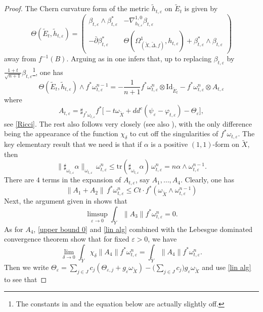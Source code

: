 \documentclass[12pt]{amsart}
\theoremstyle{definition}
\newcommand{\tX}{\widetilde{X}}
\newcommand{\tY}{\widetilde{Y}}
\newcommand{\tE}{\widetilde{E}}
\numberwithin{equation}{section}
\newcommand{\tDe}{\widetilde \Delta}
\newcommand{\ep}{\varepsilon}
\begin{document}
\begin{proof}
The Chern curvature form of the metric $\tilde h_{t,\ep}$ on $\tE_t$ is given by
 \[\Theta(\tE_t,\tilde h_{t,\ep})=
 \begin{pmatrix}
  \beta_{t,\ep}\wedge \beta_{t,\ep}^* & -\nabla^{1,0}_{h_{t,\ep}}\beta_{t,\ep}\\
 -\bar \partial  \beta_{t,\ep}^* & \Theta(\Omega_{(\tX, \tDe, f)}^1, h_{t,\ep}) +\beta_{t,\ep}^*\wedge \beta_{t,\ep}
 \end{pmatrix}
 \]
 away from $f^{-1}(B)$. Arguing as in \cite[p. 105]{DGP-Q-Fano-decomp} one infers that, up to replacing $\beta_{t,\ep}$ by $\frac{1+t}{\sqrt{n+1}}\beta_{t,\ep}$\footnote{The constants in \cite[(32)-(33)]{DGP-Q-Fano-decomp} and the equation below are actually slightly off.}, one has 
 \begin{equation}
 \label{curv}
 \Theta(\tE_t,\tilde h_{t,\ep})\wedge f^*\omega_{t,\ep}^{n-1}=-\frac 1{n+1} f^*\omega_{t,\ep}^{n} \otimes \mathrm{Id}_{\tE_t}-f^*\omega_{t,\ep}^{n} \otimes A_{t,\ep}
 \end{equation}
 where \[A_{t,\ep}=\sharp_{f^*\omega_{t,\ep}}f^*\big[-t \omega_{\tX}+dd^c(\psi_\ep-\varphi_{t,\ep})-\Theta_\ep\big],\]
see \eqref{Ricci}. The rest also follows very closely \cite{DGP-Q-Fano-decomp} (see also \cite{GSS}), with the only difference being the appearance of the function $\chi_\delta$ to cut off the singularities of $f^*\omega_{t,\ep}$. The key elementary result that we need is that if $\alpha$ is a positive $(1,1)$-form on $\tX$, then 
\begin{equation}
\label{lin alg}
\|\sharp_{\omega_{t,\ep}} \alpha\|_{\omega_{t,\ep}}\,  \omega_{t,\ep}^n  \le  \mathrm{tr}(\sharp_{\omega_{t,\ep}} \alpha) \,  \omega_{t,\ep}^n =n\alpha \wedge \omega_{t,\ep}^{n-1}.
\end{equation}
There are $4$ terms in the expansion of $A_{t,\ep}$, say $A_1, \ldots, A_4$. Clearly, one has 
\[ \|A_1+A_2\|\, f^*\omega_{t,\ep}^n \le Ct \cdot f^*(\omega_{\tX}\wedge \omega_{t,\ep}^{n-1})\]
Next, the argument given in \cite[pp.~99-100, ``The term (I)'']{DGP-Q-Fano-decomp} shows that 
\[\limsup_{\ep \to 0} \int_{\tY} \|A_3\| f^*\omega_{t,\ep}^n=0.\]
As for $A_4$, \eqref{upper bound 0} and \eqref{lin alg} combined with the Lebesgue dominated convergence theorem show that for fixed $\ep>0$, we have
\[\lim_{\delta \to 0} \int_{\tY} \chi_\delta \|A_4\| f^*\omega_{t,\ep}^n =  \int_{\tY}  \|A_4\| f^*\omega_{t,\ep}^n.\]
Then we write $\Theta_\ep=\sum_{j\in J} c_j (\Theta_{\ep, j}+g_\ep \omega_{\tX})-\big(\sum_{j\in J} c_j\big) g_\ep \omega_{\tX}$ and use \eqref{lin alg} to see that

\end{proof}
\end{document}
